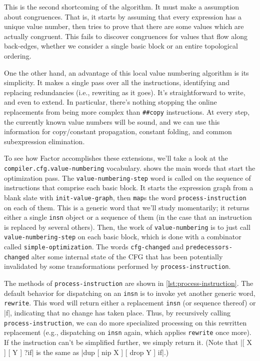 This is the second shortcoming of the algorithm.  It must make a
 assumption about congruences.  That is, it starts by
assuming that every expression has a unique value number, then tries to prove
that there are some values which are actually congruent.  This fails to
discover congruences for values that flow along back-edges, whether we consider
a single basic block or an entire topological ordering.

One the other hand, an advantage of this local value numbering algorithm is its
simplicity.  It makes a single pass over all the instructions, identifying and
replacing redundancies  (i.e., rewriting as it goes).  It's
straightforward to write, and even to extend.  In particular, there's nothing
stopping the online replacements from being more complex than \Verb|##copy|
instructions.  At every step, the currently known value numbers will be sound,
and we can use this information for copy/constant propagation, constant
folding, and common subexpression elimination.


To see how Factor accomplishes these extensions, we'll take a look at the
\Verb|compiler.cfg.value-numbering| vocabulary.
 shows the main words that start the
optimization pass.  The \Verb|value-numbering-step| word is called on the
sequence of instructions that comprise each basic block.  It starts the
expression graph from a blank slate with \Verb|init-value-graph|, then
\Verb|map|s the word \Verb|process-instruction| on each of them.  This is a
generic word that we'll study momentarily; it returns either a single
\Verb|insn| object or a sequence of them (in the case that an instruction is
replaced by several others).  Then, the work of \Verb|value-numbering| is to
just call \Verb|value-numbering-step| on each basic block, which is done with
a combinator called \Verb|simple-optimization|.  The words
\Verb|cfg-changed| and \Verb|predecessors-changed| alter some internal
state of the \gls{CFG} that has been potentially invalidated by some
transformations performed by \Verb|process-instruction|.


The methods of \Verb|process-instruction| are shown in
\vref{lst:process-instruction}.  The default behavior for dispatching on an
\Verb|insn| is to invoke yet another generic word,
\Verb|rewrite|.  This word will return either a replacement \Verb|insn| (or
sequence thereof) or \factor|f|, indicating that no change has taken place.
Thus, by recursively calling \Verb|process-instruction|, we can do more
specialized processing on this rewritten replacement (e.g., dispatching on
\Verb|insn| again, which applies \Verb|rewrite| once more).  If the
instruction can't be simplified further, we simply return it.  (Note that
%
\factor|[ X ] [ Y ] ?if|
%
is the same as
%
\factor|dup [ nip X ] [ drop Y ] if|.)

